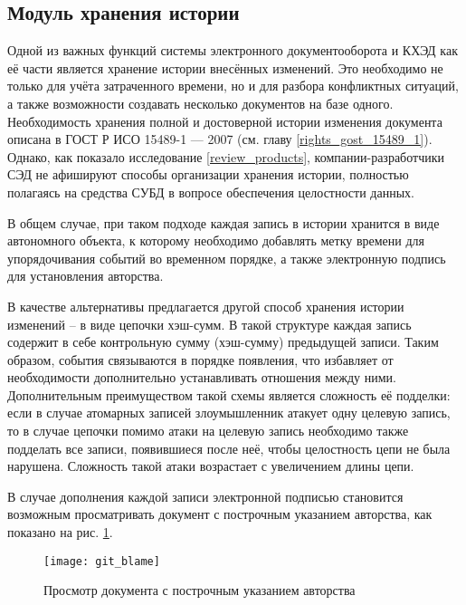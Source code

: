 \subsection{Модуль хранения истории} \label{research_history}

Одной из важных функций системы электронного документооборота и КХЭД как её части является хранение истории внесённых изменений. Это необходимо не только для учёта затраченного времени, но и для разбора конфликтных ситуаций, а также возможности создавать несколько документов на базе одного. Необходимость хранения полной и достоверной истории изменения документа описана в ГОСТ Р ИСО 15489-1 --- 2007 (см. главу \ref{rights_gost_15489_1}). Однако, как показало исследование \ref{review_products}, компании-разработчики СЭД не афишируют способы организации хранения истории, полностью полагаясь на средства СУБД в вопросе обеспечения целостности данных.

\vspace{\baselineskip}
В общем случае, при таком подходе каждая запись в истории хранится в виде автономного объекта, к которому необходимо добавлять метку времени для упорядочивания событий во временн\textit{о}м порядке, а также электронную подпись для установления авторства.

\vspace{\baselineskip}
В качестве альтернативы предлагается другой способ хранения истории изменений -- в виде цепочки хэш-сумм. В такой структуре каждая запись содержит в себе контрольную сумму (хэш-сумму) предыдущей записи. Таким образом, события связываются в порядке появления, что избавляет от необходимости дополнительно устанавливать отношения между ними. Дополнительным преимуществом такой схемы является сложность её подделки: если в случае атомарных записей злоумышленник атакует одну целевую запись, то в случае цепочки помимо атаки на целевую запись необходимо также подделать все записи, появившиеся после неё, чтобы целостность цепи не была нарушена. Сложность такой атаки возрастает с увеличением длины цепи.

\vspace{\baselineskip}
В случае дополнения каждой записи электронной подписью становится возможным просматривать документ с построчным указанием авторства, как показано на рис. \ref{img:git_blame}.

\begin{figure}[h!]
  \centering
  \texttt{[image: git\_blame]}
  \caption{Просмотр документа с построчным указанием авторства}
  \label{img:git_blame}
\end{figure}

